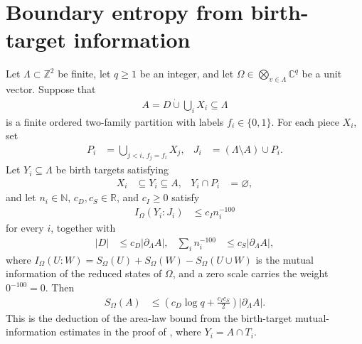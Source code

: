 \section{Boundary entropy from birth-target information}
\label{sec:area_law_birth_information}

\begin{lemma}
    \label{thm:area_law_birth_information_boundary}
    \leanok
    Let $\Lambda\subset\mathbb Z^2$ be finite, let $q\ge1$ be an integer,
    and let $\Omega\in\bigotimes_{v\in\Lambda}\mathbb C^q$ be a unit vector.
    Suppose that
    \begin{align*}
        A=D\mathbin{\dot\cup}\bigcup_iX_i\subseteq\Lambda
    \end{align*}
    is a finite ordered two-family partition with labels
    $f_i\in\{0,1\}$. For each piece $X_i$, set
    \begin{align*}
        P_i & =\bigcup_{j<i,\,f_j=f_i}X_j,
            & J_i                          & =(\Lambda\setminus A)\cup P_i.
    \end{align*}
    Let $Y_i\subseteq\Lambda$ be birth targets satisfying
    \begin{align*}
        X_i & \subseteq Y_i\subseteq A,
            & Y_i\cap P_i               & =\varnothing,
    \end{align*}
    and let $n_i\in\mathbb N$, $c_D,c_S\in\mathbb R$, and $c_I\ge0$ satisfy
    \begin{align*}
        I_\Omega(Y_i:J_i) & \le c_I n_i^{-100}
    \end{align*}
    for every $i$, together with
    \begin{align*}
        |D| & \le c_D|\partial_\Lambda A|,
            & \sum_i n_i^{-100}            & \le c_S|\partial_\Lambda A|,
    \end{align*}
    where $I_\Omega(U:W)=S_\Omega(U)+S_\Omega(W)-S_\Omega(U\cup W)$
    is the mutual information of the reduced states of $\Omega$, and a
    zero scale carries the weight $0^{-100}=0$.
    Then
    \begin{align*}
        S_\Omega(A) & \le
        \left(c_D\log q+\frac{c_Ic_S}{2}\right)|\partial_\Lambda A|.
    \end{align*}
    This is the deduction of the area-law bound from the birth-target
    mutual-information estimates in the proof of
    \cite[Theorem~1.1, lines~838--852 of Section~11]{OpenAI2026AreaLaw},
    where $Y_i=A\cap T_i$.
\end{lemma}
